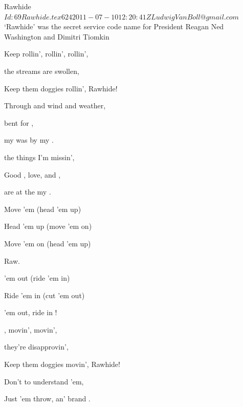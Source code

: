 \begin{SBSong}{Rawhide}
  {$Id: 69Rawhide.tex 624 2011-07-10 12:20:41Z LudwigVanBoll@gmail.com $}
  {`Rawhide' was the secret service code name for President Reagan}
  {Ned Washington and Dimitri Tiomkin}
  \begin{SBVerse}
    Keep  rollin', rollin', rollin',
    
     the streams are swollen,
    
    Keep them doggies rollin', Rawhide!
    
    Through  and wind and weather,
    
     bent for ,
    
     my  was by my .
    
     the things I'm missin',
    
    Good , love, and ,
    
    are  at the   my .
  \end{SBVerse}
  \begin{SBChorus}
    Move 'em  (head 'em up)
    
    Head 'em up (move 'em on)
    
    Move 'em on (head 'em up)
    
    Raw.
    
     'em out (ride 'em in)
    
    Ride 'em in (cut 'em out)
    
     'em out, ride  in !
  \end{SBChorus}
  \CBPageBrk
  \begin{SBVerse}
    , movin', movin',
    
     they're disapprovin',
    
    Keep them doggies movin', Rawhide!
    
    Don't  to understand 'em,
    
    Just  'em throw, an' brand .
    

\end{SBVerse}
\end{SBSong}
